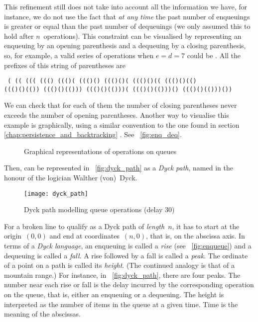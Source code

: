 This refinement still does not take into account all the information
we have, for instance, we do not use the fact that \emph{at any time}
the past number of enqueuings is greater or equal than the past number
of dequeuings (we only assumed this to hold after
\(n\)~operations). This constraint can be visualised by representing
an enqueuing by an opening parenthesis and a dequeuing by a closing
parenthesis, so, for example, a valid series of operations when
\(e=d=7\) could be \erlcode{((()()(()))())}. All the prefixes of this
string of parentheses are
\begin{center}
\tt
(\quad
((\quad
(((\quad
((()\quad
((()(\quad
((()()\quad
((()()(\quad
((()()((\quad
((()()(()\\
((()()(())\quad
((()()(()))\quad
((()()(()))(\quad
((()()(()))()\quad
((()()(()))())
\end{center}
We can check that for each of them the number of closing parentheses
never exceeds the number of opening parentheses. Another way to
visualise this example is graphically, using a similar convention to
the one found in section \ref{chap:persistence_and_backtracking}
. See 
\fig~\vref{fig:enq_deq}.
\begin{figure}
\centering
{}
\qquad
{}
\caption{Graphical representations of operations on queues\label{fig:enq_deq}}
\end{figure}
Then, \erlcode{((()()(()))())} can be represented in
\fig~\vref{fig:dyck_path} as a \emph{Dyck path}, named in the honour
of the logician Walther (von)~Dyck.
\begin{figure}[t]
\centering
\texttt{[image: dyck\_path]}
\caption{Dyck path modelling queue operations (delay \(30\))
\label{fig:dyck_path}}
\end{figure}
For a broken line to qualify as a Dyck path of \emph{length}~\(n\), it
has to start at the origin~\((0,0)\) and end at coordinates~\((n,0)\),
that is, on the abscissa axis. In terms of a \emph{Dyck language}, an
enqueuing is called a \emph{rise} (see \fig~\vref{fig:enqueue}) and a
dequeuing is called a \emph{fall}. A rise followed by a fall is called
a \emph{peak}. The ordinate of a point on a path is called its
\emph{height}. (The continued analogy is that of a mountain range.)
For instance, in \fig~\vref{fig:dyck_path}, there are four peaks. The
number near each rise or fall is the delay incurred by the
corresponding operation on the queue, that is, either an enqueuing or
a dequeuing. The height is interpreted as the number of items in the
queue at a given time. Time is the meaning of the abscissas.

